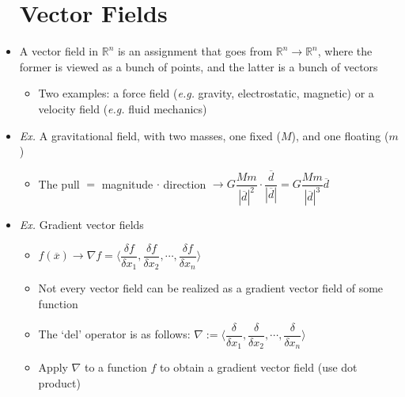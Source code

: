 \begin{itemize}

    \section{Vector Fields}

  \item A vector field in $\mathbb{R}^n$ is an assignment that goes from $\mathbb{R}^n\to\mathbb{R}^n$, where the former is viewed as a bunch of points, and the latter is a bunch of vectors

    \begin{itemize}

      \item Two examples: a force field (\textit{e.g.} gravity, electrostatic, magnetic) or a velocity field (\textit{e.g.} fluid mechanics)

    \end{itemize}

  \item \textit{Ex.} A gravitational field, with two masses, one fixed ($M$), and one floating ($m$)

    \begin{itemize}

      \item The pull $=$ magnitude $\cdot$ direction $\rightarrow G\dfrac{Mm}{|\overline{d}|^2}\cdot\dfrac{\overline{d}}{|\overline{d}|} = G\dfrac{Mm}{|\overline{d}|^3}\overline{d}$

    \end{itemize}

  \item \textit{Ex.} Gradient vector fields

    \begin{itemize}

      \item $f(\overline{x}) \rightarrow \nabla f = \Big\langle\dfrac{\delta f}{\delta x_1}, \dfrac{\delta f}{\delta x_2}, \cdots, \dfrac{\delta f}{\delta x_n}\Big\rangle$

      \item Not every vector field can be realized as a gradient vector field of some function

      \item The `del' operator is as follows: $\nabla :=\Big\langle \dfrac{\delta}{\delta x_1}, \dfrac{\delta}{\delta x_2}, \cdots, \dfrac{\delta}{\delta x_n} \Big\rangle$

      \item Apply $\nabla$ to a function $f$ to obtain a gradient vector field (use dot product)


\end{itemize}
\end{itemize}
